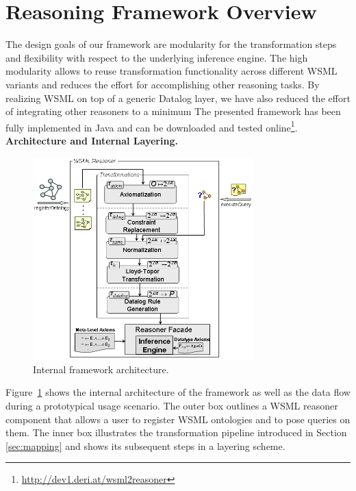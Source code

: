 \section{Reasoning Framework Overview\label{sec:framework}}
The design goals of our framework are modularity for the
transformation steps and flexibility with respect to the
underlying inference engine. The high modularity allows to reuse
transformation functionality across different WSML variants and
reduces the effort for accomplishing other reasoning tasks. By
realizing WSML on top of a generic Datalog layer, we have also
reduced the effort of integrating other reasoners to a
minimum
The presented framework has been fully implemented in Java and can
be downloaded and tested online\footnote{\url{http://dev1.deri.at/wsml2reasoner}}.\\[2mm]
{\bfseries Architecture and Internal Layering.}
\begin{figure}[bt]
    \includegraphics[width=0.76\textwidth]{figures/layering.png}
    \centering
    \caption{Internal framework architecture.
    \label{fig:layering}}\vspace{-5mm}
\end{figure}
Figure~\ref{fig:layering} shows the internal architecture of the
framework as well as the data flow during a prototypical usage
scenario. The outer box outlines a WSML reasoner component that
allows a user to register WSML ontologies and to pose queries on
them. The inner box illustrates the transformation pipeline
introduced in Section \ref{sec:mapping} and shows its subsequent
steps in a layering scheme.

